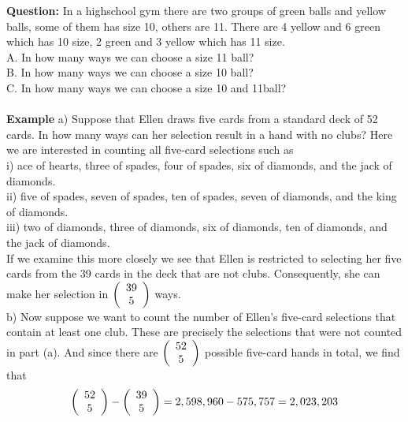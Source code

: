 \documentclass[11pt]{article}
\begin{document}
\textbf{Question:} In a highschool gym there are two groups of green balls and yellow balls, some of them has size 10, others are 11. There are 4 yellow and 6 green which has 10 size, 2 green and 3 yellow which has 11 size.\\
A. In how many ways we can choose a size 11 ball?\\
B. In how many ways we can choose a size 10 ball?\\
C. In how many ways we can choose a size 10 and 11ball?\\
\\


\textbf{Example} a) Suppose that Ellen draws five cards from a standard deck of 52 cards. 
In how many ways can her selection result in a hand with no clubs? Here we are 
interested in counting all five-card selections such as\\
i) ace of hearts, three of spades, four of spades, six of diamonds, and the jack of 
diamonds.\\
ii) five of spades, seven of spades, ten of spades, seven of diamonds, and the king of 
diamonds.\\
iii) two of diamonds, three of diamonds, six of diamonds, ten of diamonds, and the jack of 
diamonds.\\
If we examine this more closely we see that Ellen is restricted to selecting her five cards 
from the 39 cards in the deck that are not clubs. Consequently, she can make her 
selection in 
$\left( {\begin{array}{*{20}c}  39  \\  5  \\ \end{array}} \right)$ 
ways.\\
b) Now suppose we want to count the number of Ellen's five-card selections that contain 
at least one club. These are precisely the selections that were not counted in part (a). And 
since there are
$\left( {\begin{array}{*{20}c} 52  \\ 5  \\ \end{array}} \right)$ 
possible five-card hands in total, we find that 
$$ \left( {\begin{array}{*{20}c} 52  \\ 5  \\ \end{array}} \right) - \left( {\begin{array}{*{20}c} 39  \\ 5  \\ \end{array}} \right) = 2,598,960 - 575,757 = 2,023,203  $$
\end{document}
